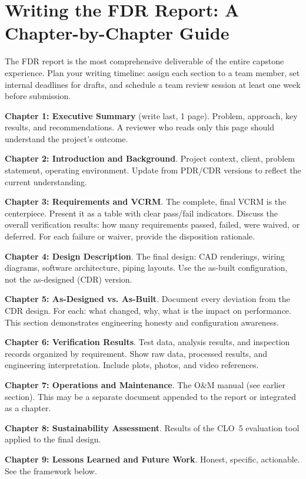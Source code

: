 \section{Writing the FDR Report: A Chapter-by-Chapter Guide}
The FDR report is the most comprehensive deliverable of the entire capstone experience. Plan your writing timeline: assign each section to a team member, set internal deadlines for drafts, and schedule a team review session at least one week before submission.

\textbf{Chapter 1: Executive Summary} (write last, 1 page). Problem, approach, key results, and recommendations. A reviewer who reads only this page should understand the project's outcome.

\textbf{Chapter 2: Introduction and Background}. Project context, client, problem statement, operating environment. Update from PDR/CDR versions to reflect the current understanding.

\textbf{Chapter 3: Requirements and VCRM}. The complete, final VCRM is the centerpiece. Present it as a table with clear pass/fail indicators. Discuss the overall verification results: how many requirements passed, failed, were waived, or deferred. For each failure or waiver, provide the disposition rationale.

\textbf{Chapter 4: Design Description}. The final design: CAD renderings, wiring diagrams, software architecture, piping layouts. Use the as-built configuration, not the as-designed (CDR) version.

\textbf{Chapter 5: As-Designed vs. As-Built}. Document every deviation from the CDR design. For each: what changed, why, what is the impact on performance. This section demonstrates engineering honesty and configuration awareness.

\textbf{Chapter 6: Verification Results}. Test data, analysis results, and inspection records organized by requirement. Show raw data, processed results, and engineering interpretation. Include plots, photos, and video references.

\textbf{Chapter 7: Operations and Maintenance}. The O\&M manual (see earlier section). This may be a separate document appended to the report or integrated as a chapter.

\textbf{Chapter 8: Sustainability Assessment}. Results of the CLO~5 evaluation tool applied to the final design.

\textbf{Chapter 9: Lessons Learned and Future Work}. Honest, specific, actionable. See the framework below.

